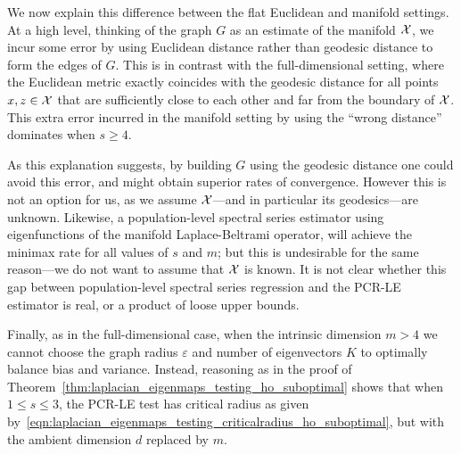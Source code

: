 We now explain this difference between the flat Euclidean and manifold settings. At a high level, thinking of the graph $G$ as an estimate of the manifold $\mathcal{X}$, we incur some error by using Euclidean distance rather than geodesic distance to form the edges of $G$. This is in contrast with the full-dimensional setting, where the Euclidean metric exactly coincides with the geodesic distance for all points $x,z \in \mathcal{X}$ that are sufficiently close to each other and far from the boundary of $\mathcal{X}$. This extra error incurred in the manifold setting by using the ``wrong distance'' dominates when $s \geq 4$. 

As this explanation suggests, by building $G$ using the geodesic distance one could avoid this error, and might obtain superior rates of convergence. However this is not an option for us, as we assume $\mathcal{X}$---and in particular its geodesics---are unknown. Likewise, a population-level spectral series estimator using eigenfunctions of the manifold Laplace-Beltrami operator, will achieve the minimax rate for all values of $s$ and $m$; but this is undesirable for the same reason---we do not want to assume that $\mathcal{X}$ is known. It is not clear whether this gap between population-level spectral series regression and the PCR-LE estimator is real, or a product of loose upper bounds. 

Finally, as in the full-dimensional case, when the intrinsic dimension $m > 4$ we cannot choose the graph radius $\varepsilon$ and number of eigenvectors $K$ to optimally balance bias and variance.  Instead, reasoning as in the proof of Theorem~\ref{thm:laplacian_eigenmaps_testing_ho_suboptimal} shows that when $1 \leq s \leq 3$, the PCR-LE test has critical radius as given by~\eqref{eqn:laplacian_eigenmaps_testing_criticalradius_ho_suboptimal}, but with the ambient dimension $d$ replaced by $m$.

